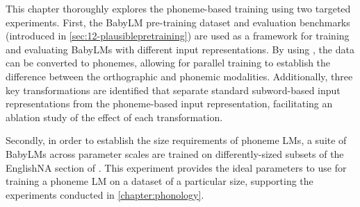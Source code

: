 This chapter thoroughly explores the phoneme-based training using two targeted experiments. First, the BabyLM pre-training dataset and evaluation benchmarks (introduced in \cref{sec:12-plausiblepretraining}) are used as a framework for training and evaluating BabyLMs with different input representations. By using \gpp, the data can be converted to phonemes, allowing for parallel training to establish the difference between the orthographic and phonemic modalities. Additionally, three key transformations are identified that separate standard subword-based input representations from the phoneme-based input representation, facilitating an ablation study of the effect of each transformation.


Secondly, in order to establish the size requirements of phoneme LMs, a suite of BabyLMs across parameter scales are trained on differently-sized subsets of the EnglishNA section of \ipachildes. This experiment provides the ideal parameters to use for training a phoneme LM on a dataset of a particular size, supporting the experiments conducted in \cref{chapter:phonology}.



